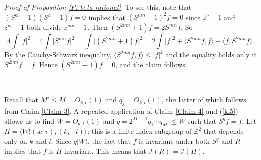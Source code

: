 \documentclass[11pt]{amsart}
\theoremstyle{definition}
\newcommand{\N}{{\mathbb N}}
\newcommand{\Z}{{\mathbb Z}}
\newcommand{\CI}{{\mathcal I}}
\newcommand{\1}{{\mathbf{1}}}
\begin{document}
\begin{proof}[Proof of Proposition \ref{P: beta rational}]
To see this, note that $(S^{m}-1)(S^{n}-1)f=0$ implies that $(S^{mn}-1)^{2}f=0$ since $z^{n}-1$ and $z^{m}-1$ both divide $z^{mn}-1$. Then 
$(S^{2mn}+1)f=2S^{mn}f.$
     So $$4\int \vert f\vert^{2}=4\int \vert S^{mn}f\vert^{2}=\int \vert (S^{2mn}+1)f\vert^{2}=2\int \vert f\vert^{2}+\langle S^{2mn}f,f\rangle+\langle f,S^{2mn}f\rangle.$$
     By the Cauchy-Schwarz inequality, $\langle S^{2mn}f,f\rangle\leq \vert f\vert^{2}$ and the equality holds only if $S^{2mn}f=f$. Hence $(S^{2mn}-1)f=0$, and the claim follows. 

     \

     Recall that $M'\leq M=O_{k,l}(1)$ and $q_{j}=O_{k,l}(1)$, the latter of which follows from Claim \ref{Claim 3}. A repeated application of Claim \ref{Claim 4} and (\ref{kl5}) allows us to find $W=O_{k,l}(1)$ and $q = 2^{M'-1} q_1 \cdots q_{M'}\leq W$ such that $S^{q}f=f$.
     Let $H = \langle W! (w,v), (k,-l)\rangle$: this is a finite index subgroup of $\mathbb{Z}^{2}$ that depends only on $k$ and $l$. 
     Since $q|W!$, the fact that $f$ is invariant under both $S^{q}$ and $R$ implies that $f$ is $H$-invariant. This means that $\CI(R)=\CI(H)$. 
     \end{proof}
\end{document}

